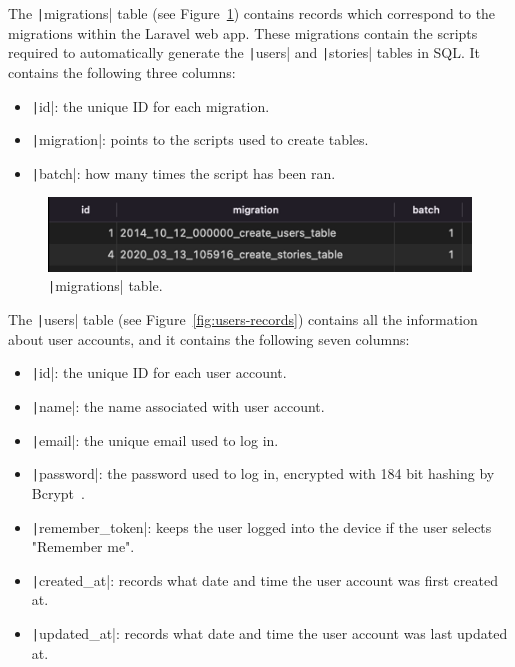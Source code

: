 The \texttt|migrations| table (see Figure~\ref{fig:migrations-records}) contains records which correspond to the migrations within the Laravel web app.
These migrations contain the scripts required to automatically generate the \texttt|users| and \texttt|stories| tables in SQL\@.
It contains the following three columns:

\begin{itemize}
    \item \texttt|id|: the unique ID for each migration.
    \item \texttt|migration|: points to the scripts used to create tables.
    \item \texttt|batch|: how many times the script has been ran.
\end{itemize}

\begin{figure}[!htbp]
    \centering
    \includegraphics[scale=0.85]{resources/database/migrations-records}
    \caption{\texttt|migrations| table.}
    \label{fig:migrations-records}
\end{figure}

The \texttt|users| table (see Figure~\ref{fig:users-records}) contains all the information about user accounts, and it contains the following seven columns:

\begin{itemize}
    \item \texttt|id|: the unique ID for each user account.
    \item \texttt|name|: the name associated with user account.
    \item \texttt|email|: the unique email used to log in.
    \item \texttt|password|: the password used to log in, encrypted with 184 bit hashing by Bcrypt~\citep{laravel2022hashing}.
    \item \texttt|remember_token|: keeps the user logged into the device if the user selects "Remember me".
    \item \texttt|created_at|: records what date and time the user account was first created at.
    \item \texttt|updated_at|: records what date and time the user account was last updated at.
\end{itemize}

